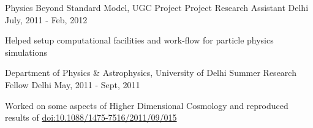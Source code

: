 \begin{cventries}
	
	\cventry
	{Physics Beyond Standard Model, UGC Project} %
	{Project Research Assistant} %
	{Delhi} %
	{July, 2011 - Feb, 2012} %
	{
		\begin{cvitems} 
			\item {Helped setup computational facilities and work-flow for particle physics simulations}
		\end{cvitems}
	}
	
\end{cventries}
\begin{cventries}
	
	\cventry
	{Department of Physics \& Astrophysics, University of Delhi} %
	{Summer Research Fellow} %
	{Delhi} %
	{May, 2011 - Sept, 2011} %
	{
		\begin{cvitems} 
			\item {Worked on some aspects of Higher Dimensional Cosmology and reproduced results of \href{https://doi.org/10.1088/1475-7516/2011/09/015}{doi:10.1088/1475-7516/2011/09/015}}
		\end{cvitems}
	}
	
\end{cventries}

